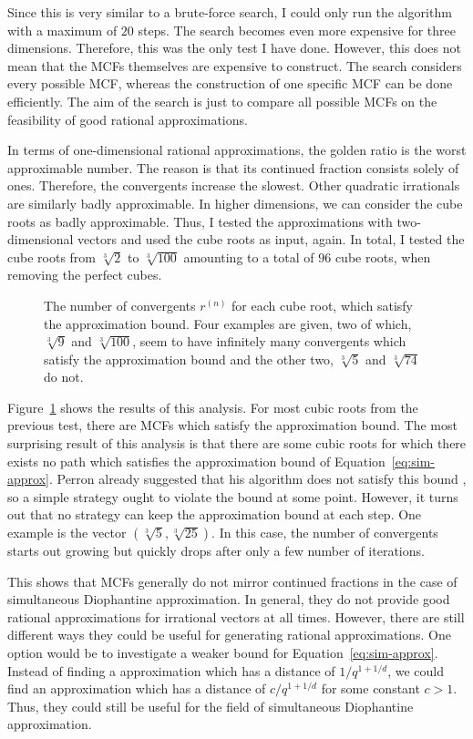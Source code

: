 Since this is very similar to a brute-force search, I could only run the
algorithm with a maximum of $20$ steps.
The search becomes even more expensive for three dimensions.
Therefore, this was the only test I have done.
However, this does not mean that the MCFs themselves are expensive to
construct.
The search considers every possible MCF,
whereas the construction of one specific MCF can be done efficiently.
The aim of the search is just to compare all possible MCFs on the feasibility
of good rational approximations.

In terms of one-dimensional rational approximations,
the golden ratio is the worst approximable number.
The reason is that its continued fraction consists solely of ones.
Therefore, the convergents increase the slowest.
Other quadratic irrationals are similarly badly approximable.
In higher dimensions, we can consider the cube roots as badly approximable.
Thus, I tested the approximations with two-dimensional vectors and used the
cube roots as input, again.
In total, I tested the cube roots from $\sqrt[3]{2}$ to $\sqrt[3]{100}$
amounting to a total of $96$ cube roots, when removing the perfect cubes.

\begin{figure}[tbp]
  \centering
  
  \caption{
    The number of convergents $r^{(n)}$ for each cube root, which
    satisfy the approximation bound.
    Four examples are given,
    two of which, $\sqrt[3]{9}$ and $\sqrt[3]{100}$, seem to have infinitely
    many convergents which satisfy the approximation bound and the other two,
    $\sqrt[3]{5}$ and $\sqrt[3]{74}$ do not.
  }
  \label{fig:results-approx}
\end{figure}

Figure~\ref{fig:results-approx} shows the results of this analysis.
For most cubic roots from the previous test,
there are MCFs which satisfy the approximation bound.
The most surprising result of this analysis is that there are some cubic roots
for which there exists no path which satisfies the approximation bound of Equation~\ref{eq:sim-approx}.
Perron already suggested that his algorithm does not satisfy this bound \cite{Perron07},
so a simple strategy ought to violate the bound at some point.
However, it turns out that no strategy can keep the approximation bound at each step.
One example is the vector $(\sqrt[3]{5}, \sqrt[3]{25})$.
In this case, the number of convergents starts out growing but quickly drops
after only a few number of iterations.

This shows that MCFs generally do not mirror continued fractions in the case of simultaneous Diophantine approximation.
In general, they do not provide good rational approximations for irrational vectors at all times.
However, there are still different ways they could be useful for generating rational approximations.
One option would be to investigate a weaker bound for Equation~\ref{eq:sim-approx}.
Instead of finding a approximation which has a distance of $1/q^{1 + 1/d}$,
we could find an approximation which has a distance of $c/q^{1 + 1/d}$ for some constant $c > 1$.
Thus, they could still be useful for the field of simultaneous Diophantine
approximation.

